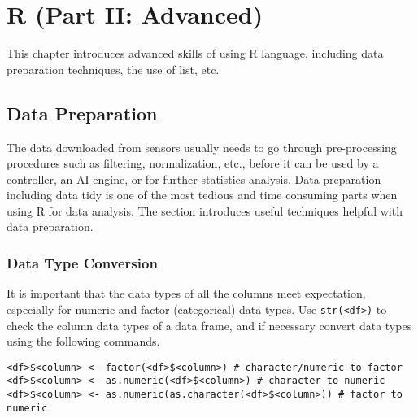 \chapter{R (Part II: Advanced)} \label{ch:r2}

This chapter introduces advanced skills of using R language, including data preparation techniques, the use of list, etc.

\section{Data Preparation} \label{ch:r2:sec:datapreparation}

The data downloaded from sensors usually needs to go through pre-processing procedures such as filtering, normalization, etc., before it can be used by a controller, an AI engine, or for further statistics analysis. Data preparation including data tidy is one of the most tedious and time consuming parts when using R for data analysis. The section introduces useful techniques helpful with data preparation.

\subsection{Data Type Conversion}

It is important that the data types of all the columns meet expectation, especially for numeric and factor (categorical) data types. Use \verb|str(<df>)| to check the column data types of a data frame, and if necessary convert data types using the following commands.
\begin{lstlisting}
<df>$<column> <- factor(<df>$<column>) # character/numeric to factor
<df>$<column> <- as.numeric(<df>$<column>) # character to numeric
<df>$<column> <- as.numeric(as.character(<df>$<column>)) # factor to numeric
\end{lstlisting}

